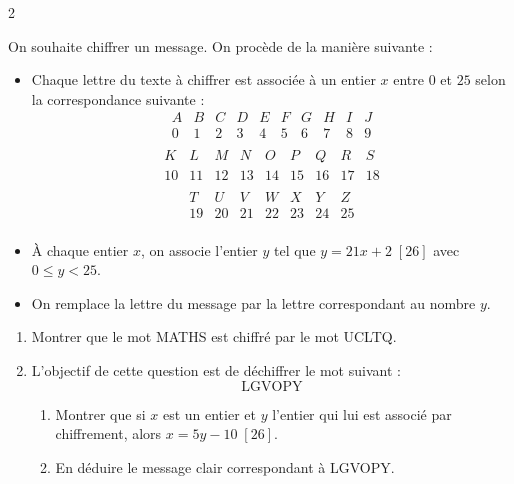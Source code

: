 \documentclass[a4paper,12pt]{article}
\begin{document}
\begin{multicols}{2}
    \begin{exercice}[title=Exercice 30 $\quad \star \star \quad$ { [Calculer, Modéliser] }]{}{}
    On souhaite chiffrer un message. On procède de la manière suivante :
    \begin{itemize}
        \item Chaque lettre du texte à chiffrer est associée à un entier $x$ entre $0$ et $25$ selon la correspondance suivante :
        \[
        \begin{array}{ccccccccccccc}
        A & B & C & D & E & F & G & H & I & J \\
        0 & 1 & 2 & 3 & 4 & 5 & 6 & 7 & 8 & 9 \\
        \end{array}
        \]
        \[
        \begin{array}{cccccccccccc}
         K & L & M & N & O & P & Q & R & S \\
         10 & 11 & 12 & 13 & 14 & 15 & 16 & 17 & 18 \\
        \end{array}
        \]
        \[
        \begin{array}{ccccccc}
        T & U & V & W & X & Y & Z \\
        19 & 20 & 21 & 22 & 23 & 24 & 25 \\
        \end{array}
        \]
        \item À chaque entier $x$, on associe l’entier $y$ tel que $y = 21x + 2 \; [26]$ avec $0 \leq y < 25$.
        \item On remplace la lettre du message par la lettre correspondant au nombre $y$.
    \end{itemize}
    \begin{enumerate}
        \item Montrer que le mot MATHS est chiffré par le mot UCLTQ.
        \item L’objectif de cette question est de déchiffrer le mot suivant :
        \[
        \text{LGVOPY}
        \]
        \begin{enumerate}
            \item Montrer que si $x$ est un entier et $y$ l’entier qui lui est associé par chiffrement, alors $x = 5y - 10 \; [26]$.
            \item En déduire le message clair correspondant à LGVOPY.
        \end{enumerate}
    \end{enumerate}
    \end{exercice}
    

\end{multicols}
\end{document}
